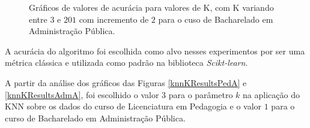 \begin{figure}[!htb]
  \centering
  \caption{\label{knnKResultsAdm} Gráficos de valores de acurácia para valores de K, com K variando entre \(3\) e \(201\) com incremento de \(2\) para o cuso de Bacharelado em Administração Pública.}
  \qquad
  \vspace{1.5em}
  \Ididthis
\end{figure}

A acurácia do algoritmo foi escolhida como alvo nesses experimentos por ser uma
métrica clássica e utilizada como padrão na biblioteca \textit{Scikt-learn}.

A partir da análise dos gráficos das Figuras \ref{knnKResultsPedA} e
\ref{knnKResultsAdmA}, foi escolhido o valor \(3\) para o parâmetro \(k\) na
aplicação do KNN sobre os dados do curso de Licenciatura em Pedagogia e o valor
\(1\) para o curso de Bacharelado em Administração Pública.

